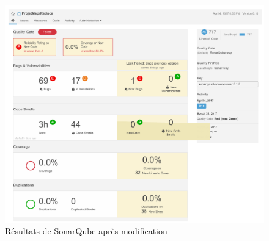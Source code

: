 \begin{figure}[H]
  \centering
    \includegraphics[width=1\textwidth]{images/sonarqube_after_cropped.pdf}
        \caption{Résultats de SonarQube après modification}
        \label{fig:sonardeuxrapport}
\end{figure}
